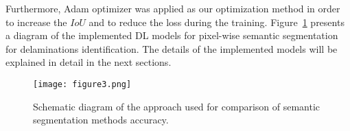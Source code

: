 Furthermore, Adam optimizer was applied as our optimization method in order to increase the \(IoU\) and to reduce the loss during the training.
Figure~\ref{fig:flowchart} presents a diagram of the implemented DL models for pixel-wise semantic segmentation for delaminations identification. 
The details of the implemented models will be explained in detail in the next sections.
\begin{figure} [h!]
	\begin{center}
		\texttt{[image: figure3.png]}
	\end{center}
	\caption{Schematic diagram of the approach used for comparison of semantic segmentation methods accuracy.} 
	\label{fig:flowchart}
\end{figure}
